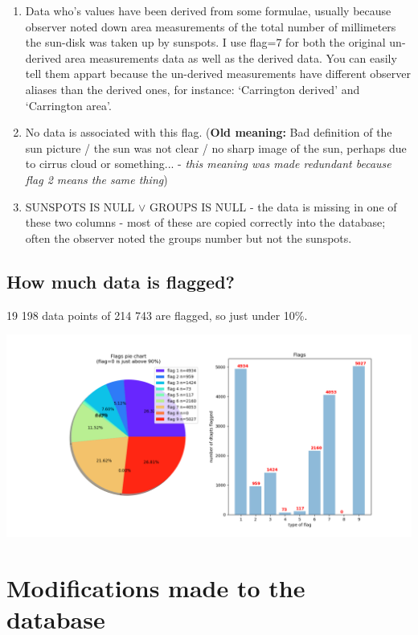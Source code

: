 \documentclass[12pt]{article}
\begin{document}
\begin{enumerate}[start=0]
    \item Data who's values have been derived from some formulae, usually because observer noted down area measurements of the total number of millimeters the sun-disk was taken up by sunspots. I use flag=7 for both the original un-derived area measurements data as well as the derived data. You can easily tell them appart because the un-derived measurements have different observer aliases than the derived ones, for instance: `Carrington derived' and `Carrington area'. 
    \item No data is associated with this flag. (\textbf{Old meaning:} Bad definition of the sun picture / the sun was not clear / no sharp image of the sun, perhaps due to cirrus cloud or something... - \textit{this meaning was made redundant because flag 2 means the same thing})
    \item SUNSPOTS IS NULL $\lor$ GROUPS IS NULL - the data is missing in one of these two columns - most of these are copied correctly into the database; often the observer noted the groups number but not the sunspots.
\end{enumerate}

\subsection{How much data is flagged?}\label{section:how much data is flagged}

19 198 data points of 214 743 are flagged, so just under 10\%.

{\centering
\label{figure:flags number of}
\includegraphics[width=\linewidth]{pie-charts-3-flags.png}
\par}


\section{Modifications made to the database}\label{section:modifications made}
\end{document}
